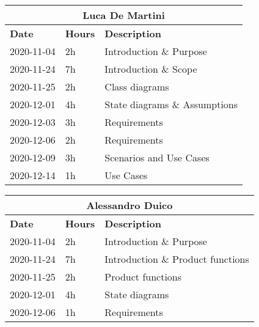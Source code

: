 
\begin{table}[H]
    \centering
    \begin{tabular}{|l|l|l|}
        \multicolumn{3}{c}{\textbf{Luca De Martini}}\\
        \hline
        \textbf{Date} & \textbf{Hours} & \textbf{Description}    \\\hline
        2020-11-04    & 2h             & Introduction \& Purpose \\\hline
        2020-11-24    & 7h             & Introduction \& Scope \\\hline
        2020-11-25    & 2h             & Class diagrams \\\hline
        2020-12-01    & 4h             & State diagrams \& Assumptions \\\hline
        2020-12-03    & 3h             & Requirements \\\hline
        2020-12-06    & 2h             & Requirements \\\hline
        2020-12-09    & 3h             & Scenarios and Use Cases\\\hline
        2020-12-14    & 1h             & Use Cases\\\hline
    \end{tabular}
\end{table}
\begin{table}[H]
    \centering
    \begin{tabular}{|l|l|l|}
        \multicolumn{3}{c}{\textbf{Alessandro Duico}}\\
        \hline
        \textbf{Date} & \textbf{Hours} & \textbf{Description}    \\\hline
        2020-11-04    & 2h             & Introduction \& Purpose \\\hline
        2020-11-24    & 7h             & Introduction \& Product functions \\\hline
        2020-11-25    & 2h             & Product functions \\\hline
        2020-12-01    & 4h             & State diagrams \\\hline
        2020-12-06    & 1h             & Requirements \\\hline
    \end{tabular}
\end{table}